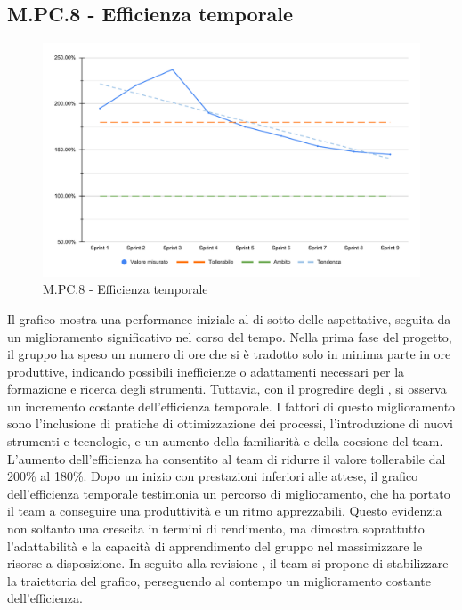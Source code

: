 \subsection{M.PC.8 - Efficienza temporale}
\begin{figure}[H]
    \centering
    \includegraphics[width=\textwidth]{assets/efficienza_temporale.pdf}
    \caption{M.PC.8 - Efficienza temporale}
\end{figure}

\par Il grafico mostra una performance iniziale al di sotto delle aspettative, seguita da un miglioramento significativo nel corso del tempo. Nella prima fase del progetto, il gruppo ha speso un numero di ore che si è tradotto solo in minima parte in ore produttive, indicando possibili inefficienze o adattamenti necessari per la formazione e ricerca degli strumenti. Tuttavia, con il progredire degli , si osserva un incremento costante dell'efficienza temporale. I fattori di questo miglioramento sono l'inclusione di pratiche di ottimizzazione dei processi, l'introduzione di nuovi strumenti e tecnologie, e un aumento della familiarità e della coesione del team. L’aumento dell’efficienza ha consentito al team di ridurre il valore tollerabile dal 200\% al 180\%.
Dopo un inizio con prestazioni inferiori alle attese, il grafico dell'efficienza temporale testimonia un percorso di miglioramento, che ha portato il team a conseguire una produttività e un ritmo apprezzabili. Questo evidenzia non soltanto una crescita in termini di rendimento, ma dimostra soprattutto l'adattabilità e la capacità di apprendimento del gruppo nel massimizzare le risorse a disposizione. In seguito alla revisione , il team si propone di stabilizzare la traiettoria del grafico, perseguendo al contempo un miglioramento costante dell’efficienza.

